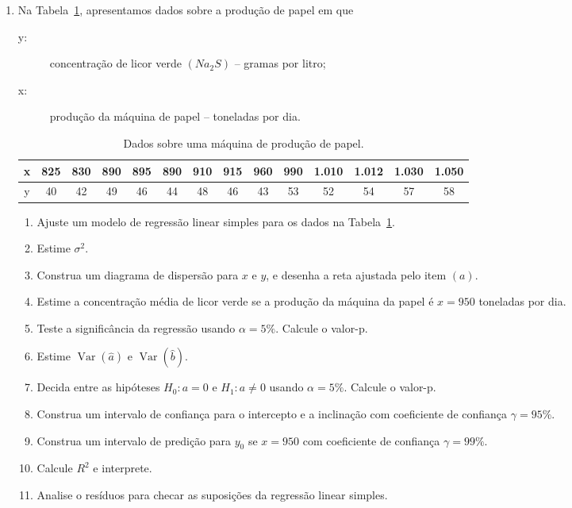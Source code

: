 \documentclass[12pt, a4paper]{article}
\DeclareMathOperator {\vari}{Var}
\begin{document}
\begin{enumerate}
	\item Na Tabela~\ref{tab:prod-papel}, apresentamos dados sobre a produção de papel em que 
	\begin{description}
		\item[y:] concentração de licor verde $(Na_2S)$ -- gramas por litro;
		\item[x:] produção da máquina de papel -- toneladas por dia.
	\end{description}
	\begin{table}[ht]
		\centering
		\begin{tabular}{c|ccccccccccccc}
			\toprule[0.05cm]
			x & 825 & 830 & 890 & 895 & 890 & 910 & 915 & 960 & 990 & 1.010 & 1.012 & 1.030 & 1.050 \\ \midrule[0.025cm]
			y & 40 & 42 & 49 & 46 & 44 & 48 & 46 & 43 & 53 & 52 & 54 & 57 & 58 \\  
			\bottomrule[0.05cm]
		\end{tabular}
		\caption{Dados sobre uma máquina de produção de papel.} 
		\label{tab:prod-papel}
	\end{table}
	\begin{enumerate}
		\item Ajuste um modelo de regressão linear simples para os dados na Tabela~\ref{tab:prod-papel}.
		\item Estime $\sigma^2$.
		\item Construa um diagrama de dispersão para $x$ e $y$, e desenha a reta ajustada pelo item $(a)$.
		\item Estime a concentração média de licor verde se a produção da máquina da papel é $x=950$ toneladas por dia.
		\item Teste a significância da regressão usando $\alpha=5\%$. Calcule o valor-p.
		\item Estime $\vari\left(\hat{a}\right)$ e $\vari\left(\hat{b}\right)$.
		\item Decida entre as hipóteses $H_0: a = 0$ e $H_1: a \neq 0$ usando $\alpha=5\%$. Calcule o valor-p.
		\item Construa um intervalo de confiança para o intercepto e a inclinação com coeficiente de confiança $\gamma=95\%$.
		\item Construa um intervalo de predição para $y_0$ se $x=950$ com coeficiente de confiança $\gamma=99\%$.
		\item Calcule $R^2$ e interprete.
		\item Analise o resíduos para checar as suposições da regressão linear simples.
	\end{enumerate}


\end{enumerate}
\end{document}
